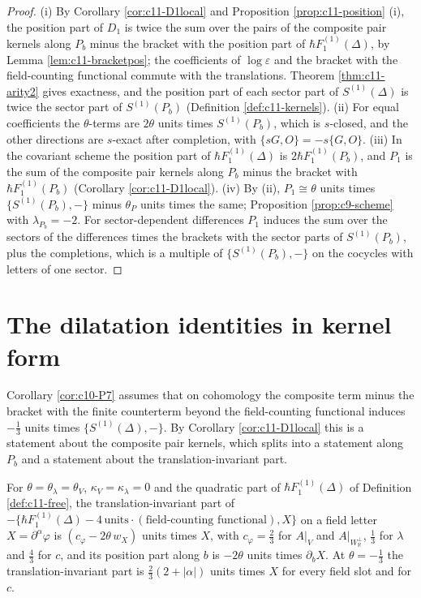 \begin{proof}
(i) By Corollary \ref{cor:c11-D1local} and Proposition \ref{prop:c11-position} (i), the position part of $D_1$ is twice the sum over the pairs of the composite pair kernels along $P_b$ minus the bracket with the position part of $\hbar F_1^{(1)}(\Delta)$, by Lemma \ref{lem:c11-bracketpos}; the coefficients of $\log\varepsilon$ and the bracket with the field-counting functional commute with the translations. Theorem \ref{thm:c11-arity2} gives exactness, and the position part of each sector part of $S^{(1)}(\Delta)$ is twice the sector part of $S^{(1)}(P_b)$ (Definition \ref{def:c11-kernels}). (ii) For equal coefficients the $\theta$-terms are $2\theta$ units times $S^{(1)}(P_b)$, which is $s$-closed, and the other directions are $s$-exact after completion, with $\{sG,O\}=-s\{G,O\}$. (iii) In the covariant scheme the position part of $\hbar F_1^{(1)}(\Delta)$ is $2\hbar F_1^{(1)}(P_b)$, and $P_1$ is the sum of the composite pair kernels along $P_b$ minus the bracket with $\hbar F_1^{(1)}(P_b)$ (Corollary \ref{cor:c11-D1local}). (iv) By (ii), $P_1\cong\theta$ units times $\{S^{(1)}(P_b),-\}$ minus $\theta_P$ units times the same; Proposition \ref{prop:c9-scheme} with $\lambda_{P_b}=-2$. For sector-dependent differences $P_1$ induces the sum over the sectors of the differences times the brackets with the sector parts of $S^{(1)}(P_b)$, plus the completions, which is a multiple of $\{S^{(1)}(P_b),-\}$ on the cocycles with letters of one sector.
\end{proof}

\section{The dilatation identities in kernel form}

Corollary \ref{cor:c10-P7} assumes that on cohomology the composite term minus the bracket with the finite counterterm beyond the field-counting functional induces $-\tfrac13$ units times $\{S^{(1)}(\Delta),-\}$. By Corollary \ref{cor:c11-D1local} this is a statement about the composite pair kernels, which splits into a statement along $P_b$ and a statement about the translation-invariant part.

\begin{lemma}
\label{lem:c11-onebody}
For $\theta=\theta_\lambda=\theta_V$, $\kappa_V=\kappa_\lambda=0$ and the quadratic part of $\hbar F_1^{(1)}(\Delta)$ of Definition \ref{def:c11-free}, the translation-invariant part of $-\big\{\hbar F_1^{(1)}(\Delta)-4\,\text{units}\cdot(\text{field-counting functional}),X\big\}$ on a field letter $X=\partial^\alpha\varphi$ is $(c_\varphi-2\theta\,w_X)$ units times $X$, with $c_\varphi=\tfrac23$ for $A|_V$ and $A|_{W_{\mathbb R}^\perp}$, $\tfrac13$ for $\lambda$ and $\tfrac43$ for $c$, and its position part along $b$ is $-2\theta$ units times $\partial_bX$. At $\theta=-\tfrac13$ the translation-invariant part is $\tfrac23(2+|\alpha|)$ units times $X$ for every field slot and for $c$.
\end{lemma}

